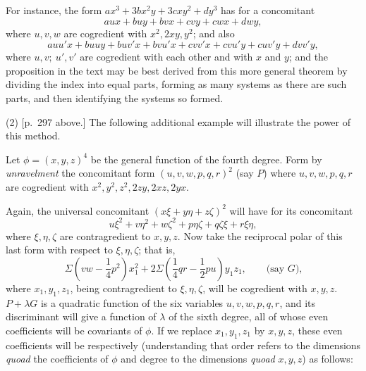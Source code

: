 \documentclass[11pt]{article}
\begin{document}
For instance, the form $ax^3+3bx^2y+3cxy^2+dy^3$ has for a concomitant
\[
aux+buy+bvx+cvy+cwx+dwy,
\]
where $u,v,w$ are cogredient with $x^2,2xy,y^2$; and also
\[
auu'x+buuy+buv'x+bvu'x+cvv'x+cvu'y+cuv'y+dvv'y,
\]
where $u,v;\ u',v'$ are cogredient with each other and with $x$ and $y$; and the proposition in the text may be best derived from this more general theorem by dividing the index into equal parts, forming as many systems as there are such parts, and then identifying the systems so formed.

(2) [p.~297 above.] The following additional example will illustrate the power of this method.

Let $\phi=(x,y,z)^4$ be the general function of the fourth degree. Form by \emph{unravelment} the concomitant form $(u,v,w,p,q,r)^2$ (say $P$) where $u,v,w,p,q,r$ are cogredient with $x^2,y^2,z^2,2zy,2xz,2yx$.

Again, the universal concomitant $(x\xi+y\eta+z\zeta)^2$ will have for its concomitant
\[
u\xi^2+v\eta^2+w\zeta^2+p\eta\zeta+q\zeta\xi+r\xi\eta,
\]
where $\xi,\eta,\zeta$ are contragredient to $x,y,z$. Now take the reciprocal polar of this last form with respect to $\xi,\eta,\zeta$; that is,
\[
\Sigma\left(vw-\frac14p^2\right)x_1^2
+2\Sigma\left(\frac14qr-\frac12pu\right)y_1z_1,\qquad \text{(say }G\text{),}
\]
where $x_1,y_1,z_1$, being contragredient to $\xi,\eta,\zeta$, will be cogredient with $x,y,z$. $P+\lambda G$ is a quadratic function of the six variables $u,v,w,p,q,r$, and its discriminant will give a function of $\lambda$ of the sixth degree, all of whose even coefficients will be covariants of $\phi$. If we replace $x_1,y_1,z_1$ by $x,y,z$, these even coefficients will be respectively (understanding that order refers to the dimensions \emph{quoad} the coefficients of $\phi$ and degree to the dimensions \emph{quoad} $x,y,z$) as follows:
\end{document}
